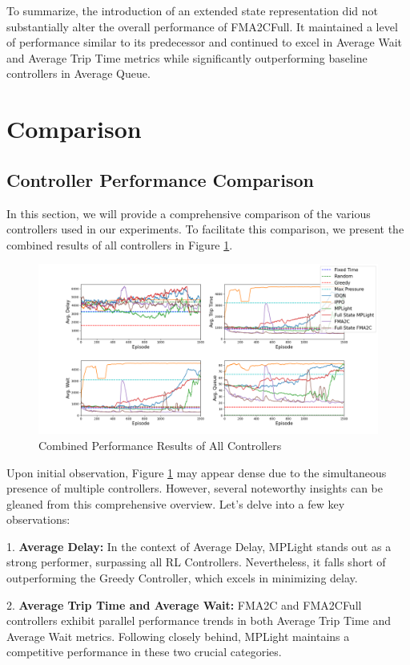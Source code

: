 To summarize, the introduction of an extended state representation did not substantially alter the overall performance of FMA2CFull. It maintained a level of performance similar to its predecessor and continued to excel in Average Wait and Average Trip Time metrics while significantly outperforming baseline controllers in Average Queue.

\section{Comparison}
\subsection{Controller Performance Comparison}
In this section, we will provide a comprehensive comparison of the various controllers used in our experiments. To facilitate this comparison, we present the combined results of all controllers in Figure \ref{fig:all_results}.

\begin{figure}[h]
    \centering
    \includegraphics[width=1\linewidth]{images/experiments/all.png}
    \caption{Combined Performance Results of All Controllers}
    \label{fig:all_results}
\end{figure}
\newpage
Upon initial observation, Figure \ref{fig:all_results} may appear dense due to the simultaneous presence of multiple controllers. However, several noteworthy insights can be gleaned from this comprehensive overview. Let's delve into a few key observations:

1. \textbf{Average Delay:} In the context of Average Delay, MPLight stands out as a strong performer, surpassing all RL Controllers. Nevertheless, it falls short of outperforming the Greedy Controller, which excels in minimizing delay.

2. \textbf{Average Trip Time and Average Wait:} FMA2C and FMA2CFull controllers exhibit parallel performance trends in both Average Trip Time and Average Wait metrics. Following closely behind, MPLight maintains a competitive performance in these two crucial categories.

